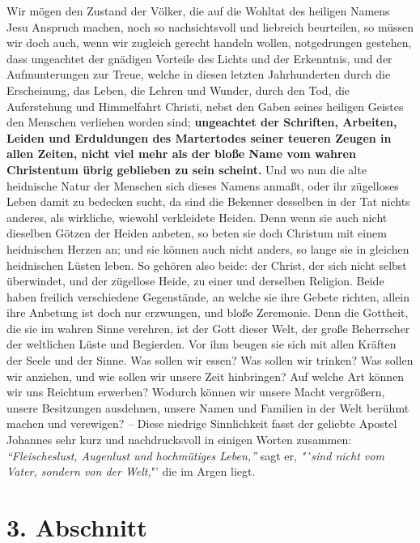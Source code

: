 \label{ref:01_02_urchristentum} Wir mögen den Zustand der Völker, die auf die Wohltat des heiligen Namens Jesu
Anspruch machen, noch so nachsichtsvoll und liebreich beurteilen, so müssen wir
doch auch, wenn wir zugleich gerecht handeln wollen, notgedrungen gestehen, dass
ungeachtet der gnädigen Vorteile des Lichts und der Erkenntnis, und der
Aufmunterungen zur Treue, welche in diesen letzten Jahrhunderten durch die
Erscheinung, das Leben, die Lehren und Wunder, durch den Tod, die Auferstehung
und Himmelfahrt Christi, nebst den Gaben seines heiligen Geistes den Menschen
verliehen worden sind; \textbf{ungeachtet der Schriften, Arbeiten, Leiden und
Erduldungen des Martertodes seiner teueren Zeugen in allen Zeiten, nicht viel
mehr als der bloße Name vom wahren Christentum übrig geblieben zu sein
scheint.} Und wo nun die alte heidnische Natur der Menschen sich dieses Namens
anmaßt, oder ihr zügelloses Leben damit zu bedecken sucht, da sind die Bekenner
desselben in der Tat nichts anderes, als wirkliche, wiewohl verkleidete Heiden.
Denn wenn sie auch nicht dieselben Götzen der Heiden anbeten, so beten sie doch
Christum mit einem heidnischen Herzen an; und sie können auch nicht anders, so
lange sie in gleichen heidnischen Lüsten leben. So gehören also beide: der
Christ, der sich nicht selbst überwindet, und der zügellose Heide, zu einer und
derselben Religion. Beide haben freilich verschiedene Gegenstände,
an welche sie ihre Gebete richten, allein ihre Anbetung ist doch nur erzwungen,
und bloße Zeremonie. Denn die Gottheit, die sie im wahren Sinne verehren, ist
der Gott dieser Welt, der große Beherrscher der weltlichen Lüste und Begierden.
Vor ihm beugen sie sich mit allen Kräften der Seele und der Sinne. Was sollen
wir essen? Was sollen wir trinken? Was sollen wir anziehen, und wie sollen wir
unsere Zeit hinbringen? Auf welche Art können wir uns Reichtum erwerben?
Wodurch können wir unsere Macht vergrößern, unsere Besitzungen ausdehnen, unsere
Namen und Familien in der Welt berühmt machen und verewigen? -- Diese niedrige
Sinnlichkeit fasst der geliebte Apostel Johannes sehr kurz und nachdrucksvoll in
einigen Worten zusammen:
\textit{"`Fleischeslust, Augenlust und hochmütiges
Leben,"'} sagt er, \textit{"`sind nicht vom Vater, sondern von der Welt,}"' die im Argen liegt.

\section{3. Abschnitt} \label{kap1_ab3}

